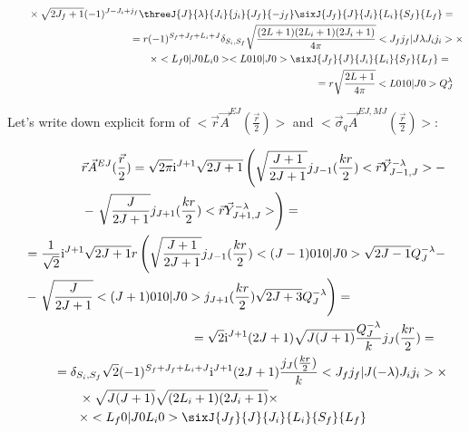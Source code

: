 \begin{align}
\begin{split}
        &\qquad\times \sqrt{2J_f + 1} (-1)^{J-J_i+j_f} \threeJ{J}{\lambda}{J_i}{j_i}{J_f}{-j_f} \sixJ{J_f}{J}{J_i}{L_i}{S_f}{L_f} =
    \end{split} \\
    \begin{split}
        &= r (-1)^{S_f + J_f + L_i + J} \delta_{S_i, S_f} \sqrt{\frac{(2L+1)(2L_i+1)(2J_i+1)}{4\pi}} <J_f j_f | J \lambda J_i j_i> \times \\
        &\qquad\times <L_f 0 | J 0 L_i 0> <L 0 1 0 | J 0> \sixJ{J_f}{J}{J_i}{L_i}{S_f}{L_f} =
    \end{split} \\
    \begin{split}
        &=r \sqrt{\frac{2L+1}{4 \pi}} <L 0 1 0 | J 0> Q_{J}^{\lambda}
    \end{split}
\end{align}

Let's write down explicit form of $<\vec{r}\vec{A}^{EJ}(\frac{\vec{r}}{2})>$ and $<\vec{\sigma}_{q}\vec{A}^{EJ, MJ}(\frac{\vec{r}}{2})>$:

\begin{align}
    \begin{split}
        &\vec{r} \vec{A}^{EJ}(\frac{\vec{r}}{2}) = \sqrt{2\pi} \mathrm{i}^{J+1} \sqrt{2J+1} \left( \sqrt{\frac{J+1}{2J+1}} j_{J-1}(\frac{kr}{2})<\vec{r} \vec{Y}^{-\lambda}_{J-1, J}> - \right.\\
        &- \left. \sqrt{\frac{J}{2J+1}} j_{J+1}(\frac{kr}{2}) <\vec{r} \vec{Y}_{J+1, J}^{-\lambda}> \right) =
    \end{split}\\
    \begin{split}
        &= \frac{1}{\sqrt{2}} \mathrm{i}^{J+1} \sqrt{2J+1} r \left( \sqrt{\frac{J+1}{2J+1}} j_{J-1}(\frac{kr}{2}) <(J-1) 0 1 0 | J 0> \sqrt{2J-1} Q_{J}^{- \lambda} - \right.\\
        &- \left. \sqrt{\frac{J}{2J+1}} <(J+1) 0 1 0 | J 0> j_{J+1}(\frac{kr}{2}) \sqrt{2J+3} Q_{J}^{- \lambda} \right) =
    \end{split}\\
    \begin{split}
        &= \sqrt{2} \mathrm{i}^{J+1} (2J+1) \sqrt{J (J+1)}  \frac{Q_{J}^{- \lambda}}{k} j_J(\frac{k r}{2}) =
    \end{split}\\
    \begin{split}
        &= \delta_{S_i, S_f} \sqrt{2} (-1)^{S_f + J_f + L_i + J} \mathrm{i}^{J+1} (2J+1) \frac{j_J(\frac{k r}{2})}{k} <J_f j_f | J (-\lambda) J_i j_i> \times \\
        &\qquad\times \sqrt{J (J+1)} \sqrt{(2L_i+1)(2J_i+1)} \times \\
        &\qquad\times <L_f 0 | J 0 L_i 0> \sixJ{J_f}{J}{J_i}{L_i}{S_f}{L_f}
    \end{split}
\end{align}

